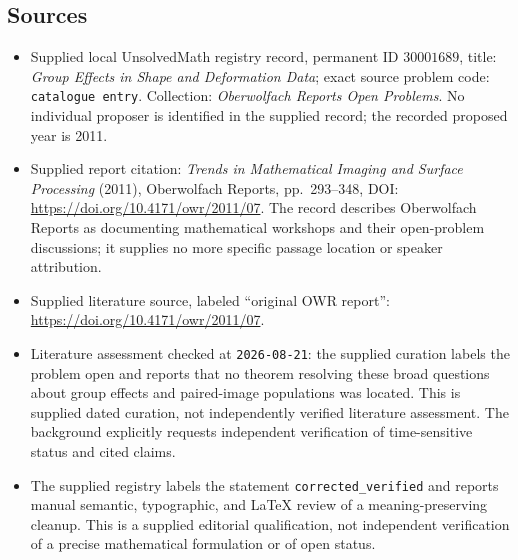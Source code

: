 \documentclass[11pt]{article}
\begin{document}
\subsection{Sources}
\begin{itemize}
\item Supplied local UnsolvedMath registry record, permanent ID \(30001689\), title: \emph{Group Effects in Shape and Deformation Data}; exact source problem code: \texttt{catalogue entry}. Collection: \emph{Oberwolfach Reports Open Problems}. No individual proposer is identified in the supplied record; the recorded proposed year is 2011.
\item Supplied report citation: \emph{Trends in Mathematical Imaging and Surface Processing} (2011), Oberwolfach Reports, pp.~293--348, DOI: \url{https://doi.org/10.4171/owr/2011/07}. The record describes Oberwolfach Reports as documenting mathematical workshops and their open-problem discussions; it supplies no more specific passage location or speaker attribution.
\item Supplied literature source, labeled ``original OWR report'': \url{https://doi.org/10.4171/owr/2011/07}.
\item Literature assessment checked at \texttt{2026-08-21}: the supplied curation labels the problem open and reports that no theorem resolving these broad questions about group effects and paired-image populations was located. This is supplied dated curation, not independently verified literature assessment. The background explicitly requests independent verification of time-sensitive status and cited claims.
\item The supplied registry labels the statement \texttt{corrected\_verified} and reports manual semantic, typographic, and LaTeX review of a meaning-preserving cleanup. This is a supplied editorial qualification, not independent verification of a precise mathematical formulation or of open status.
\end{itemize}
\end{document}
